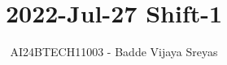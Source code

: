 \documentclass[journal]{IEEEtran}
\begin{document}

\vspace{3cm}

\title{2022-Jul-27 Shift-1}
\author{AI24BTECH11003 - Badde Vijaya Sreyas}
{\let\newpage\relax\maketitle}

\renewcommand{\thefigure}{\theenumi}
\renewcommand{\thetable}{\theenumi}
\setlength{\intextsep}{10pt} %


\renewcommand{\thetable}{\theenumi}
\end{document}

